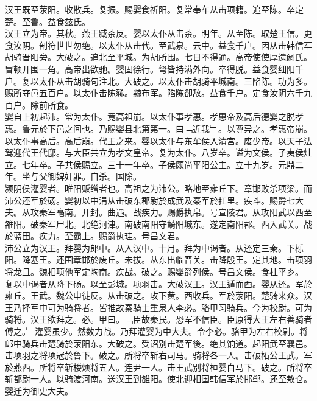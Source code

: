 \documentclass{zhvt-classic}
\begin{document}
\hspace*{2em}汉王既至荥阳。收散兵。复振。赐婴食祈阳。复常奉车从击项籍。追至陈。卒定楚。至鲁。益食兹氏。\\
\hspace*{2em}汉王立为帝。其秋。燕王臧荼反。婴以太仆从击荼。明年。从至陈。取楚王信。更食汝阴。剖符世世勿绝。以太仆从击代。至武泉。云中。益食千户。因从击韩信军胡骑晋阳旁。大破之。追北至平城。为胡所围。七日不得通。高帝使使厚遗阏氏。冒顿开围一角。高帝出欲驰。婴固徐行。弩皆持满外向。卒得脱。益食婴细阳千户。复以太仆从击胡骑句注北。大破之。以太仆击胡骑平城南。三陷陈。功为多。赐所夺邑五百户。以太仆击陈豨。黥布军。陷陈卻敌。益食千户。定食汝阴六千九百户。除前所食。\\
\hspace*{2em}婴自上初起沛。常为太仆。竟高祖崩。以太仆事孝惠。孝惠帝及高后德婴之脱孝惠。鲁元於下邑之间也。乃赐婴县北第第一。曰﹁近我﹂。以尊异之。孝惠帝崩。以太仆事高后。高后崩。代王之来。婴以太仆与东牟侯入清宫。废少帝。以天子法驾迎代王代邸。与大臣共立为孝文皇帝。复为太仆。八岁卒。谥为文侯。子夷侯灶立。七年卒。子共侯赐立。三十一年卒。子侯颇尚平阳公主。立十九岁。元鼎二年。坐与父御婢奸罪。自杀。国除。\\
\hspace*{2em}颍阴侯灌婴者。睢阳贩缯者也。高祖之为沛公。略地至雍丘下。章邯败杀项梁。而沛公还军於砀。婴初以中涓从击破东郡尉於成武及秦军於扛里。疾斗。赐爵七大夫。从攻秦军亳南。开封。曲遇。战疾力。赐爵执帛。号宣陵君。从攻阳武以西至雒阳。破秦军尸北。北绝河津。南破南阳守齮阳城东。遂定南阳郡。西入武关。战於蓝田。疾力。至霸上。赐爵执珪。号昌文君。\\
\hspace*{2em}沛公立为汉王。拜婴为郎中。从入汉中。十月。拜为中谒者。从还定三秦。下栎阳。降塞王。还围章邯於废丘。未拔。从东出临晋关。击降殷王。定其地。击项羽将龙且。魏相项他军定陶南。疾战。破之。赐婴爵列侯。号昌文侯。食杜平乡。\\
\hspace*{2em}复以中谒者从降下砀。以至彭城。项羽击。大破汉王。汉王遁而西。婴从还。军於雍丘。王武。魏公申徒反。从击破之。攻下黄。西收兵。军於荥阳。楚骑来众。汉王乃择军中可为骑将者。皆推故秦骑士重泉人李必。骆甲习骑兵。今为校尉。可为骑将。汉王欲拜之。必。甲曰。﹁臣故秦民。恐军不信臣。臣原得大王左右善骑者傅之。﹂灌婴虽少。然数力战。乃拜灌婴为中大夫。令李必。骆甲为左右校尉。将郎中骑兵击楚骑於荥阳东。大破之。受诏别击楚军後。绝其饷道。起阳武至襄邑。击项羽之将项冠於鲁下。破之。所将卒斩右司马。骑将各一人。击破柘公王武。军於燕西。所将卒斩楼烦将五人。连尹一人。击王武别将桓婴白马下。破之。所将卒斩都尉一人。以骑渡河南。送汉王到雒阳。使北迎相国韩信军於邯郸。还至敖仓。婴迁为御史大夫。\\
\end{document}
